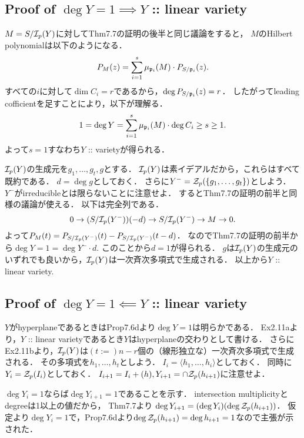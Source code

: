\documentclass[a4paper]{jsarticle}
\begin{document}
    \subsection{Proof of $\deg Y=1 \implies Y$ :: linear variety}
    $M=S/\mathcal{I}_p(Y)$に対してThm7.7の証明の後半と同じ議論をすると，
    $M$のHilbert polynomialは以下のようになる．
    \[ P_M(z)=\sum_{i=1}^{s} \mu_{\mathfrak{p}_i}(M) \cdot P_{S/\mathfrak{p}_i}(z). \]
    すべての$i$に対して$\dim C_i=r$であるから，$\deg P_{S/\mathfrak{p}_i}(z)=r$．
    したがってleading cofficientを足すことにより，以下が理解る．
    \[ 1=\deg Y=\sum_{i=1}^s \mu_{\mathfrak{p}_i}(M) \cdot \deg C_i \geq s \geq 1. \]
    よって$s=1$すなわち$Y$ :: varietyが得られる．

    $\mathcal{I}_p(Y)$の生成元を$g_1,\dots,g_t,g$とする．
    $\mathcal{I}_p(Y)$は素イデアルだから，これらはすべて既約である．
    $d=\deg g$としておく．
    さらに$Y^-=\mathcal{Z}_p(\{g_1,\dots,g_t\})$としよう．
    $Y^-$がirreducibleとは限らないことに注意せよ．
    するとThm7.7の証明の前半と同様の議論が使える．
    以下は完全列である．
    \[ 0 \to (S/\mathcal{I}_p(Y^-))(-d) \to S/\mathcal{I}_p(Y^-) \to M \to 0. \]
    よって$P_{M}(t)=P_{S/\mathcal{I}_p(Y^-)}(t)-P_{S/\mathcal{I}_p(Y^-)}(t-d)$．
    なのでThm7.7の証明の前半から$\deg Y=1=\deg Y^- \cdot d$.
    このことから$d=1$が得られる．
    $g$は$\mathcal{I}_p(Y)$の生成元のいずれでも良いから，$\mathcal{I}_p(Y)$は一次斉次多項式で生成される．
    以上から$Y$ :: linear variety.


    \subsection{Proof of $\deg Y=1 \impliedby Y$ :: linear variety}
    $Y$がhyperplaneであるときはProp7.6dより$\deg Y=1$は明らかである．
    Ex2.11aより，$Y$ :: linear varietyであるとき$Y$はhyperplaneの交わりとして書ける．
    さらにEx2.11bより，$\mathcal{I}_p(Y)$は$(t:=)n-r$個の（線形独立な）一次斉次多項式で生成される．
    その多項式を$h_1,\dots,h_t$としよう．
    $I_i=\langle h_1,\dots,h_i \rangle$としておく．
    同時に$Y_i=\mathcal{Z}_p(I_i)$としておく．
    $I_{i+1}=I_i+(h), Y_{i+1}=\cap \mathcal{Z}_p(h_{i+1})$に注意せよ．

    $\deg Y_i=1$ならば$\deg Y_{i+1}=1$であることを示す．
    intersection multiplicityとdegreeは1以上の値だから，
    Thm7.7より
    $\deg Y_{i+1}=(\deg Y_i)(\deg \mathcal{Z}_p(h_{i+1}))$．
    仮定より$\deg Y_i=1$で，Prop7.6dより$\deg \mathcal{Z}_p(h_{i+1})=\deg h_{i+1}=1$なので主張が示された．
\end{document}
